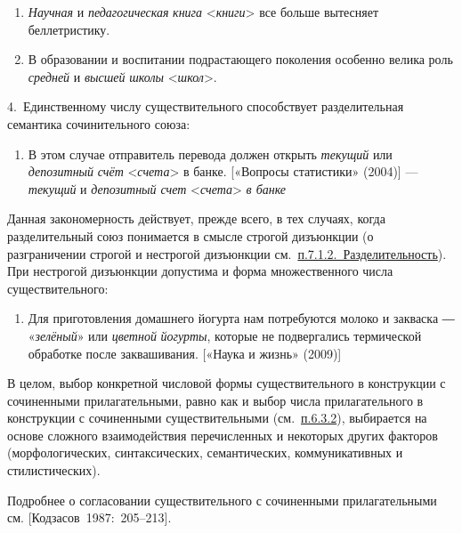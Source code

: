 \begin{enumerate}
\def\labelenumi{(\arabic{enumi})}
\setcounter{enumi}{151}
\item
  \textit{Научная} и \textit{педагогическая} \textit{книга}
  \textless*\textit{книги}\textgreater{} все больше вытесняет
  беллетристику.
\item
  В образовании и воспитании подрастающего поколения особенно велика
  роль \textit{средней} и \textit{высшей} \textit{школы}
  \textless*\textit{школ}\textgreater.
\end{enumerate}

4.~Единственному числу существительного способствует разделительная
семантика сочинительного союза:

\begin{enumerate}
\def\labelenumi{(\arabic{enumi})}
\setcounter{enumi}{153}
\item
  В этом случае отправитель перевода должен открыть \textit{текущий} или
  \textit{депозитный} \textit{счёт} \textless*\textit{счета}\textgreater{} в
  банке. {[}«Вопросы статистики» (2004){]} --- \textit{текущий} и
  \textit{депозитный счет} \textless{}\textit{счета}\textgreater{} \textit{в
  банке}
\end{enumerate}

Данная закономерность действует, прежде всего, в тех случаях, когда
разделительный союз понимается в смысле строгой дизъюнкции (о
разграничении строгой и нестрогой дизъюнкции
см.~\underline{п.7.1.2.~Разделительность}). При нестрогой дизъюнкции
допустима и форма множественного числа существительного:

\begin{enumerate}
\def\labelenumi{(\arabic{enumi})}
\setcounter{enumi}{154}
\item
  Для приготовления домашнего йогурта нам потребуются молоко и закваска
  ― «\textit{зелёный}» или \textit{цветной} \textit{йогурты}, которые не
  подвергались термической обработке после заквашивания. {[}«Наука и
  жизнь» (2009){]}
\end{enumerate}

В целом, выбор конкретной числовой формы существительного в конструкции
с сочиненными прилагательными, равно как и выбор числа прилагательного в
конструкции с сочиненными существительными (см.~\underline{п.6.3.2}),
выбирается на основе сложного взаимодействия перечисленных и некоторых
других факторов (морфологических, синтаксических, семантических,
коммуникативных и стилистических).

Подробнее о согласовании существительного с сочиненными прилагательными
см. {[}Кодзасов~1987:~205--213{]}.

